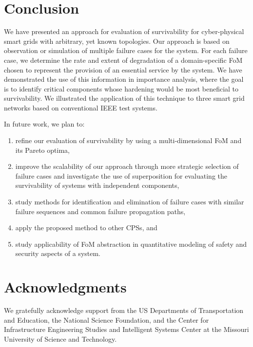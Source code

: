 \documentclass[review]{elsarticle}
\begin{document}
\section{Conclusion}
\label{sec:conc}
We have presented an approach for evaluation of survivability for cyber-physical smart grids with arbitrary, yet known topologies. Our approach is based on observation or simulation of multiple failure cases for the system. For each failure case, we determine the rate and extent of degradation of a domain-specific FoM chosen to represent the provision of an essential service by the system. We have demonstrated the use of this information in importance analysis, where the goal is to identify critical components whose hardening would be most beneficial to survivability. We illustrated the application of this technique to three smart grid networks based on conventional IEEE test systems.

In future work, we plan to:
\begin{enumerate}
  \item refine our evaluation of survivability by using a multi-dimensional FoM and its Pareto optima,
  \item improve the scalability of our approach through more strategic selection of failure cases and investigate the use of superposition for evaluating the survivability of systems with independent components,
  \item study methods for identification and elimination of failure cases with similar failure sequences and common failure propagation paths,
  \item apply the proposed method to other CPSs, and
  \item study applicability of FoM abstraction in quantitative modeling of safety and security aspects of a system.
\end{enumerate}

\section*{Acknowledgments}
We gratefully acknowledge support from the US Departments of Transportation and Education, the National Science Foundation, and the Center for Infrastructure Engineering Studies and Intelligent Systems Center at the Missouri University of Science and Technology.


\end{document}
